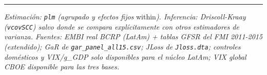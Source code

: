 \documentclass[
]{article}
\begin{document}
\begin{center}\rule{0.5\linewidth}{0.5pt}\end{center}

\emph{Estimación: \texttt{plm} (agrupado y efectos fijos }within\emph{).
Inferencia: Driscoll-Kraay (\texttt{vcovSCC}) salvo donde se compara
explícitamente con otros estimadores de varianza. Fuentes: EMBI real
BCRP (LatAm) + tablas GFSR del FMI 2011-2015 (extendido); GaR de
\texttt{gar\_panel\_all15.csv}; JLoss de \texttt{Jloss.dta}; controles
domésticos y VIX/g\_GDP solo disponibles para el núcleo LatAm; VIX
global CBOE disponible para las tres bases.}
\end{document}
